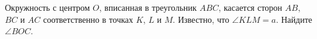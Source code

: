 \begin{ex}
	\begin{condition}
		Окружность с центром \( O \), вписанная в треугольник \( ABC \), касается сторон \( AB \), \( BC  \) и \( AC  \) соответственно в точках \( K \), \( L \) и \( M  \). Известно, что \( \angle KLM = a \). Найдите \( \angle BOC \).
	\end{condition}
\end{ex}